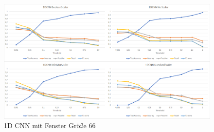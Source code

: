 \documentclass[12pt,a4paper]{scrartcl}
\numberwithin{equation}{section}
\begin{document}
\thispagestyle{plain}

\begin{figure}[ht!]
	\centering
	  \includegraphics[scale=0.5]{1DCNN_66.png}
	  \caption{1D CNN mit Fenster Größe 66}
	\label{1DCNN_20}
\end{figure}
 \newpage
\thispagestyle{plain}
\end{document}
